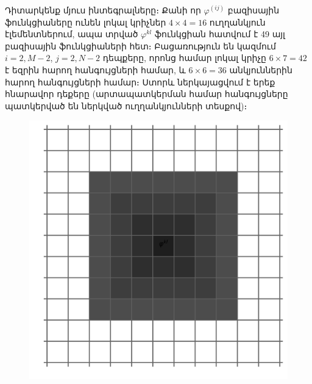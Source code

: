 \documentclass[fleqn, bachelor,subf,12pt,notitlepage]{article}
\begin{document}
Դիտարկենք մյուս ինտեգրալները։ Քանի որ $\varphi^{(ij)}$ բազիսային ֆունկցիաները ունեն լոկալ կրիչներ $4 \times 4 = 16$ ուղղանկյուն էլեմենտներում, ապա տրված $\varphi^{kl}$ ֆունկցիան հատվում է 49 այլ բազիսային ֆունկցիաների հետ։ Բացառություն են կազմում $i=2, M-2$, $j=2, N-2$ դեպքերը, որոնց համար լոկալ կրիչը $6 \times 7 = 42$ է եզրին հարող հանգույցների համար, և $6 \times 6 = 36$ անկյուններին հարող հանգույցների համար։ Ստորև ներկայացվում է երեք հնարավոր դեքերը (արտապատկերման համար հանգույցները պատկերված են ներկված ուղղանկյունների տեսքով)։
\begin{figure}[H]
  \centering
  \begin{minipage}[b]{0.2\textwidth}
    \includegraphics[width=\textwidth]{images/two_dimensional_basis_intersection}
  \end{minipage}
  \hfill
  \begin{minipage}[b]{0.2\textwidth}

\end{minipage}
\end{figure}
\end{document}
